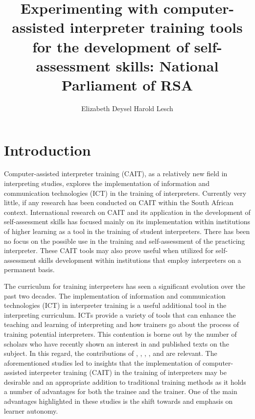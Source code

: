\documentclass[output=paper]{langsci/langscibook}
\author{Elizabeth Deysel \lastand Harold Lesch}
\title{Experimenting with computer-assisted interpreter training tools for the development of self-assessment skills: National Parliament of RSA}
\begin{document}
\section{Introduction} 
Computer-assisted interpreter training (\textsc{CAIT}), as a relatively new field in interpreting studies, explores the implementation of information and communication technologies (\textsc{ICT}) in the training of interpreters. Currently very little, if any research has been conducted on \textsc{CAIT} within the South African context. International research on \textsc{CAIT} and its application in the development of self-assessment skills has focused mainly on its implementation within institutions of higher learning as a tool in the training of student interpreters. There has been no focus on the possible use in the training and self-assessment of the practicing interpreter. These \textsc{CAIT} tools may also prove useful when utilized for self-assessment skills development within institutions that employ interpreters on a permanent basis.  

The curriculum for training interpreters has seen a significant evolution over the past two decades. The implementation of information and communication technologies (\textsc{ICT}) in interpreter training is a useful additional tool in the interpreting curriculum. \textsc{ICT}s provide a variety of tools that can enhance the teaching and learning of interpreting and how trainers go about the process of training potential interpreters. This contention is borne out by the number of scholars who have recently shown an interest in and published texts on the subject. In this regard, the contributions of \citet{Lim2014}, \citet{Pinazo2008}, \citet{Gorm2007}, \citet{Sandrelli2007b}, \citet{Lee2005} and \citet{Sandrelli2015, Sandrelli2007b, Sandrelli2002} are relevant. The aforementioned studies led to insights that the implementation of computer-assisted interpreter training (\textsc{CAIT}) in the training of interpreters may be desirable and an appropriate addition to traditional training methods as it holds a number of advantages for both the trainee and the trainer. One of the main advantages highlighted in these studies is the shift towards and emphasis on learner autonomy. 
\end{document}
